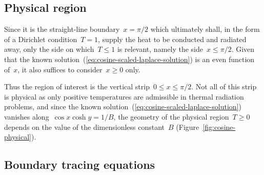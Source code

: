 \begin{figure}
\end{figure}

\subsection{Physical region}
\label{sec:cartesian.cosine.physical}

Since it is the straight-line boundary~$x = \pi/2$
which ultimately shall, in the form of a Dirichlet condition~$T = 1$,
supply the heat to be conducted and radiated away,
only the side on which~$T \le 1$ is relevant,
namely the side~$x \le \pi/2$.
Given that the known solution~(\ref{eq:cosine-scaled-laplace-solution})
is an even function of~$x$,
it also suffices to consider~$x \ge 0$ only.

Thus the region of interest
is the vertical strip~$0 \le x \le \pi/2$.
Not all of this strip is physical
as only positive temperatures are admissible
in thermal radiation problems,
and since the known solution~(\ref{eq:cosine-scaled-laplace-solution})
vanishes along~$\cos x \cosh y = 1 / B$,
the geometry of the physical region~$T \ge 0$
depends on the value of the dimensionless constant~$B$
(Figure~\ref{fig:cosine-physical}).

\subsection{Boundary tracing equations}
\label{sec:cartesian.cosine.tracing}


